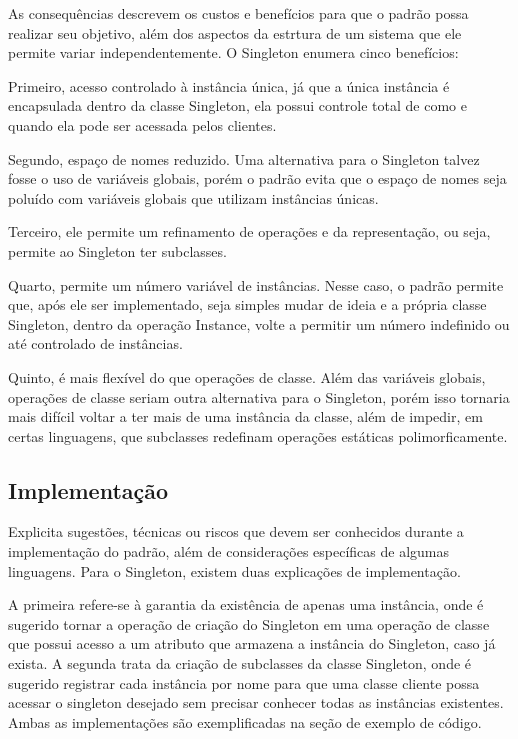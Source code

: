 As consequências descrevem os custos e benefícios para 
que o padrão possa realizar seu objetivo, além dos 
aspectos da estrtura de um sistema que ele permite variar 
independentemente. O Singleton enumera cinco benefícios:

Primeiro, acesso controlado à instância única, já que 
a única instância é encapsulada dentro da classe 
Singleton, ela possui controle total de como e quando 
ela pode ser acessada pelos clientes.

Segundo, espaço de nomes reduzido. Uma alternativa 
para o Singleton talvez fosse o uso de variáveis 
globais, porém o padrão evita que o espaço de nomes 
seja poluído com variáveis globais que utilizam 
instâncias únicas.

Terceiro, ele permite um refinamento de operações e da 
representação, ou seja, permite ao Singleton ter 
subclasses.

Quarto, permite um número variável de instâncias. Nesse 
caso, o padrão permite que, após ele ser implementado, 
seja simples mudar de ideia e a própria classe Singleton, 
dentro da operação Instance, volte a permitir um número 
indefinido ou até controlado de instâncias.

Quinto, é mais flexível do que operações de classe. Além 
das variáveis globais, operações de classe seriam outra 
alternativa para o Singleton, porém isso tornaria mais 
difícil voltar a ter mais de uma instância da classe, 
além de impedir, em certas linguagens, que subclasses 
redefinam operações estáticas polimorficamente.

\subsection*{Implementação}

Explicita sugestões, técnicas ou riscos que devem 
ser conhecidos durante a implementação do padrão, 
além de considerações específicas de algumas 
linguagens. Para o Singleton, existem duas 
explicações de implementação.

A primeira refere-se à garantia da existência de 
apenas uma instância, onde é sugerido tornar a operação 
de criação do Singleton em uma operação de classe 
que possui acesso a um atributo que armazena a 
instância do Singleton, caso já exista. A segunda 
trata da criação de subclasses da classe Singleton, 
onde é sugerido registrar cada instância por nome 
para que uma classe cliente possa acessar o singleton 
desejado sem precisar conhecer todas as instâncias 
existentes. Ambas as implementações são 
exemplificadas na seção de exemplo de código.



